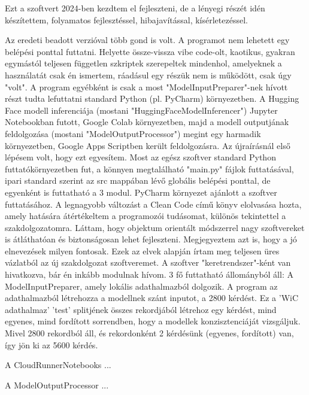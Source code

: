 \usepackage{graphicx}\begin{Document}
                         Ezt a szoftvert 2024-ben kezdtem el fejleszteni, de a lényegi részét idén készítettem, folyamatos fejlesztéssel, hibajavítással, kísérletezéssel.


                         Az eredeti beadott verzióval több gond is volt. A programot nem lehetett egy belépési ponttal futtatni. Helyette össze-vissza vibe code-olt, kaotikus, gyakran egymástól teljesen független szkriptek szerepeltek mindenhol, amelyeknek a használatát csak én ismertem, ráadásul egy részük nem is működött, csak úgy "volt". A program egyébként is csak a most "ModelInputPreparer"-nek hívott részt tudta lefuttatni standard Python (pl. PyCharm) környezetben. A Hugging Face modell inferenciája (mostani "HuggingFaceModelInferencer") Jupyter Notebookban futott, Google Colab környezetben, majd a modell outputjának feldolgozása (mostani "ModelOutputProcessor") megint egy harmadik környezetben, Google Apps Scriptben került feldolgozásra.
                         Az újraírásnál első lépésem volt, hogy ezt egyesítem. Most az egész szoftver standard Python futtatókörnyezetben fut, a könnyen megtalálható "main.py" fájlok futtatásával, ipari standard szerint az src mappában lévő globális belépési ponttal, de egyenként is futtatható a 3 modul. PyCharm környezet ajánlott a szoftver futtatásához.
                         A legnagyobb változást a Clean Code című könyv elolvasása hozta, amely hatására átértékeltem a programozói tudásomat, különös tekintettel a szakdolgozatomra. Láttam, hogy objektum orientált módszerrel nagy szoftvereket is átláthatóan és biztonságosan lehet fejleszteni. Megjegyeztem azt is, hogy a jó elnevezések milyen fontosak. Ezek az elvek alapján írtam meg teljesen üres vázlatból az új szakdolgozat szoftveremet.
                         A szoftver "keretrendszer"-ként van hivatkozva, bár én inkább modulnak hívom. 3 fő futtatható állományból áll:
                         A ModelInputPreparer, amely lokális adathalmazból dolgozik. A program az adathalmazból létrehozza a modellnek szánt inputot, a 2800 kérdést. Ez a 'WiC adathalmaz' 'test' splitjének összes rekordjából létrehoz egy kérdést, mind egyenes, mind fordított sorrendben, hogy a modellek konzisztenciáját vizsgáljuk. Mivel 2800 rekordból áll, és rekordonként 2 kérdésünk (egyenes, fordított) van, így jön ki az 5600 kérdés.

                         A CloudRunnerNotebooks ...


                         A ModelOutputProcessor ...



\end{Document}
